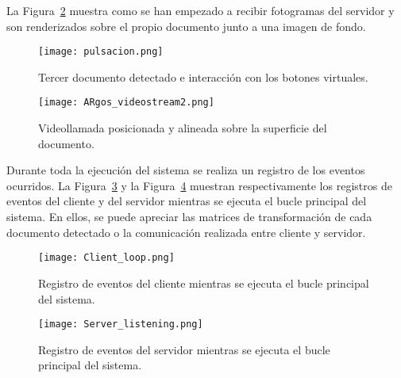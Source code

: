 La Figura~\ref{fig:ARgos_videostream2} muestra como se han empezado a recibir fotogramas del servidor y son renderizados sobre el propio documento junto a una imagen de fondo.

\begin{figure}
  \begin{center}
    \texttt{[image: pulsacion.png]}
    \caption{Tercer documento detectado e interacción con los botones virtuales.}
    \label{fig:ARgos_facture3}
  \end{center}
\end{figure}

\begin{figure}
  \begin{center}
    \texttt{[image: ARgos\_videostream2.png]}
    \caption{Videollamada posicionada y alineada sobre la superficie del documento.}
    \label{fig:ARgos_videostream2}
  \end{center}
\end{figure}

Durante toda la ejecución del sistema se realiza un registro de los eventos ocurridos. La Figura~\ref{fig:Client_loop} y la Figura~\ref{fig:Server_listening} muestran respectivamente los registros de eventos del cliente y
del servidor mientras se ejecuta el bucle principal del sistema. En ellos, se puede apreciar las matrices de transformación de cada documento detectado o la comunicación realizada entre cliente y servidor.

\begin{figure}
  \begin{center}
    \texttt{[image: Client\_loop.png]}
    \caption{Registro de eventos del cliente mientras se ejecuta el bucle principal del sistema.}
    \label{fig:Client_loop}
  \end{center}
\end{figure}

\begin{figure}
  \begin{center}
    \texttt{[image: Server\_listening.png]}
    \caption{Registro de eventos del servidor mientras se ejecuta el bucle principal del sistema.}
    \label{fig:Server_listening}
  \end{center}
\end{figure}















